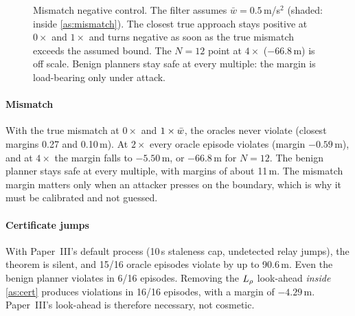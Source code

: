 \begin{figure}[t]
\centering
{}
\caption{Mismatch negative control. The filter assumes $\bar w=0.5$\,m/s$^2$
(shaded: inside \cref{as:mismatch}). The closest true approach stays
positive at $0\times$ and $1\times$ and turns negative as soon as the true
mismatch exceeds the assumed bound. The $N=12$ point at $4\times$
($-66.8$\,m) is off scale. Benign planners stay safe at every multiple: the
margin is load-bearing only under attack.}
\label{fig:mismatch}
\end{figure}

\paragraph{Mismatch} With the true mismatch at $0\times$ and $1\times\bar w$, the
oracles never violate (closest margins 0.27 and 0.10\,m). At $2\times$ every
oracle episode violates (margin $-0.59$\,m), and at $4\times$ the margin falls to
$-5.50$\,m, or $-66.8$\,m for $N=12$. The benign planner stays safe at every
multiple, with margins of about 11\,m. The mismatch margin matters only when
an attacker presses on the boundary, which is why it must be calibrated and
not guessed.

\paragraph{Certificate jumps} With Paper~III's default process (10\,s
staleness cap, undetected relay jumps), the theorem is silent, and 15/16
oracle episodes violate by up to 90.6\,m. Even the benign planner violates in
6/16 episodes. Removing the $L_{\rho}$ look-ahead \emph{inside}
\cref{as:cert} produces violations in 16/16 episodes, with a margin of
$-4.29$\,m. Paper~III's look-ahead is therefore necessary, not cosmetic.


